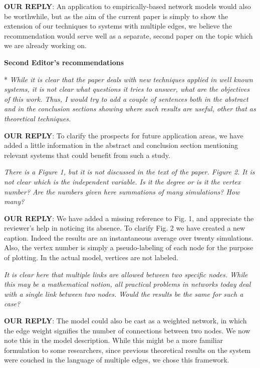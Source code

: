 \documentclass[12pt]{article}
\begin{document}
\textbf{OUR REPLY}: An application to empirically-based network models
would also be worthwhile, but as the aim of the current paper is
simply to show the extension of our techniques to systems with
multiple edges, we believe the recommendation would serve well as a
separate, second paper on the topic which we are already working on.
\vspace*{\baselineskip}

\textbf{Second Editor's recommendations}

* {\em While it is clear that the paper deals with new techniques
  applied in well known systems, it is not clear what questions it
  tries to answer, what are the objectives of this work. Thus, I would
  try to add a couple of sentences both in the abstract and in the
  conclusion sections showing where such results are useful, other
  that as theoretical techniques.}

\textbf{OUR REPLY}: To clarify the prospects for future application
areas, we have added a little information in the abstract and
conclusion section mentioning relevant systems that could benefit from
such a study.  \vspace*{\baselineskip}

{\em There is a Figure 1, but it is not discussed in the text of the
  paper.  Figure 2. It is not clear which is the independent
  variable. Is it the degree or is it the vertex number? Are the
  numbers given here summations of many simulations?  How many?}

\textbf{OUR REPLY}: We have added a missing reference to Fig. 1, and
appreciate the reviewer's help in noticing its absence. To clarify
Fig. 2 we have created a new caption. Indeed the results are an
instantaneous average over twenty simulations. Also, the vertex number
is simply a pseudo-labeling of each node for the purpose of
plotting. In the actual model, vertices are not labeled.
\vspace*{\baselineskip}

{\em It is clear here that multiple links are allowed between two
  specific nodes.  While this may be a mathematical notion, all
  practical problems in networks today deal with a single link between
  two nodes. Would the results be the same for such a case?}

\textbf{OUR REPLY}: The model could also be cast as a weighted
network, in which the edge weight signifies the number of connections
between two nodes. We now note this in the model description. While
this might be a more familiar formulation to some researchers, since
previous theoretical results on the system were couched in the
language of multiple edges, we chose this framework. 
\vspace*{\baselineskip}

 
\end{document}
